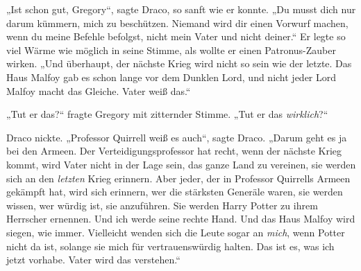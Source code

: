 „Ist schon gut, Gregory“, sagte Draco, so sanft wie er konnte.
„Du musst dich nur darum kümmern, mich zu beschützen. Niemand wird dir einen Vorwurf machen, wenn du meine Befehle befolgst, nicht mein Vater und nicht deiner.“ Er legte so viel Wärme wie möglich in seine Stimme, als wollte er einen Patronus-Zauber wirken.
„Und überhaupt, der nächste Krieg wird nicht so sein wie der letzte. Das Haus Malfoy gab es schon lange vor dem Dunklen Lord, und nicht jeder Lord Malfoy macht das Gleiche. Vater weiß das.“

„Tut er das?“ fragte Gregory mit zitternder Stimme.
„Tut er das \emph{wirklich}?“

Draco nickte.
„Professor Quirrell weiß es auch“, sagte Draco.
„Darum geht es ja bei den Armeen. Der Verteidigungsprofessor hat recht, wenn der nächste Krieg kommt, wird Vater nicht in der Lage sein, das ganze Land zu vereinen, sie werden sich an den \emph{letzten} Krieg erinnern. Aber jeder, der in Professor Quirrells Armeen gekämpft hat, wird sich erinnern, wer die stärksten Generäle waren, sie werden wissen, wer würdig ist, sie anzuführen. Sie werden Harry Potter zu ihrem Herrscher ernennen. Und ich werde seine rechte Hand. Und das Haus Malfoy wird siegen, wie immer. Vielleicht wenden sich die Leute sogar an \emph{mich}, wenn Potter nicht da ist, solange sie mich für vertrauenswürdig halten. Das ist es, was ich jetzt vorhabe. Vater wird das verstehen.“

